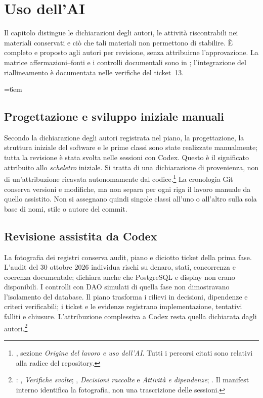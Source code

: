 \chapter{Uso dell'AI}\label{ch:ai}
Il capitolo distingue le dichiarazioni degli autori, le attività riscontrabili
nei materiali conservati e ciò che tali materiali non permettono di stabilire.
È completo e proposto agli autori per revisione, senza attribuirne
l'approvazione. La matrice affermazioni--fonti e i controlli documentali sono
in ; l'integrazione del
riallineamento è documentata nelle verifiche del ticket~13.

\begingroup
\emergencystretch=6em
\def\UrlBreaks{\do\a\do\b\do\c\do\d\do\e\do\f\do\g\do\h\do\i\do\j\do\k\do\l\do\m\do\n\do\o\do\p\do\q\do\r\do\s\do\t\do\u\do\v\do\w\do\x\do\y\do\z\do\A\do\B\do\C\do\D\do\E\do\F\do\G\do\H\do\I\do\J\do\K\do\L\do\M\do\N\do\O\do\P\do\Q\do\R\do\S\do\T\do\U\do\V\do\W\do\X\do\Y\do\Z}

\section{Progettazione e sviluppo iniziale manuali}
Secondo la dichiarazione degli autori registrata nel piano, la progettazione,
la struttura iniziale del software e le prime classi sono state realizzate
manualmente; tutta la revisione è stata svolta nelle sessioni con Codex.
Questo è il significato attribuito allo \emph{scheletro} iniziale.
Si tratta di una dichiarazione di provenienza, non di un'attribuzione
ricavata autonomamente dal codice.\footnote{\raggedright {},
sezione \emph{Origine del lavoro e uso dell'AI}. Tutti i percorsi citati
sono relativi alla radice del repository.}
La cronologia Git conserva versioni e modifiche, ma non separa per ogni
riga il lavoro manuale da quello assistito. Non si assegnano quindi singole
classi all'uno o all'altro sulla sola base di nomi, stile o autore del commit.

\section{Revisione assistita da Codex}
La fotografia dei registri conserva audit, piano e diciotto ticket della
prima fase. L'audit del 30 ottobre 2026 individua rischi su denaro, stati,
concorrenza e coerenza documentale; dichiara anche che PostgreSQL e display
non erano disponibili. I controlli con DAO simulati di quella fase non
dimostravano l'isolamento del database. Il piano trasforma i rilievi in
decisioni, dipendenze e criteri verificabili; i ticket e le evidenze
registrano implementazione, tentativi falliti e chiusure. L'attribuzione
complessiva a Codex resta quella dichiarata dagli autori.\footnote{\raggedright 
{}: ,
\emph{Verifiche svolte}; ,
\emph{Decisioni raccolte} e \emph{Attività e dipendenze};
. Il manifest interno
 identifica la fotografia, non una trascrizione delle sessioni.}

